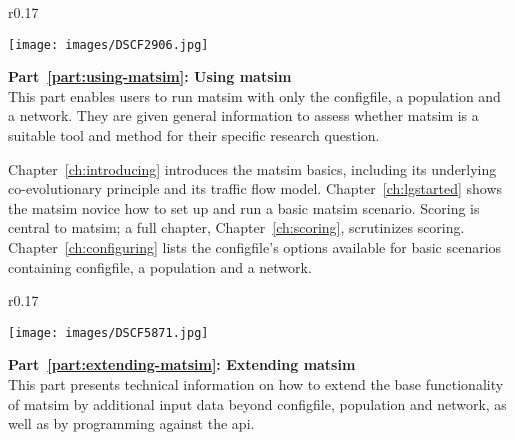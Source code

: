 \clearpage
\begin{wrapfigure}[6]{r}{0.17\textwidth}
\vspace{-5pt}
  \begin{center}
    \texttt{[image: images/DSCF2906.jpg]}
  \end{center}
\end{wrapfigure}
\textbf{Part~\ref{part:using-matsim}: Using \acrshort{matsim}}\\
This part enables users to run \gls{matsim} with only the \gls{configfile}, a population and a network. They are given general information to assess whether \gls{matsim} is a suitable tool and method for their specific research question.

Chapter~\ref{ch:introducing} introduces the \gls{matsim} basics, including its underlying co-evolutionary principle and its traffic flow model. 
Chapter~\ref{ch:lgstarted} shows the \gls{matsim} novice how to set up and run a basic \gls{matsim} \gls{scenario}. 
Scoring is central to \gls{matsim}; a full chapter, Chapter~\ref{ch:scoring}, scrutinizes scoring. 
Chapter~\ref{ch:configuring} lists the \gls{configfile}'s options available for basic scenarios containing \gls{configfile}, a population and a network.  


\begin{wrapfigure}[6]{r}{0.17\textwidth}
\vspace{-10pt}
  \begin{center}
    \texttt{[image: images/DSCF5871.jpg]}
  \end{center}
\end{wrapfigure}
\textbf{Part~\ref{part:extending-matsim}: Extending \acrshort{matsim}}\\
This part
presents 
technical information on how to extend the base functionality of \gls{matsim} by additional input data beyond \gls{configfile}, population and network, as well as by programming against the \gls{api}. 

